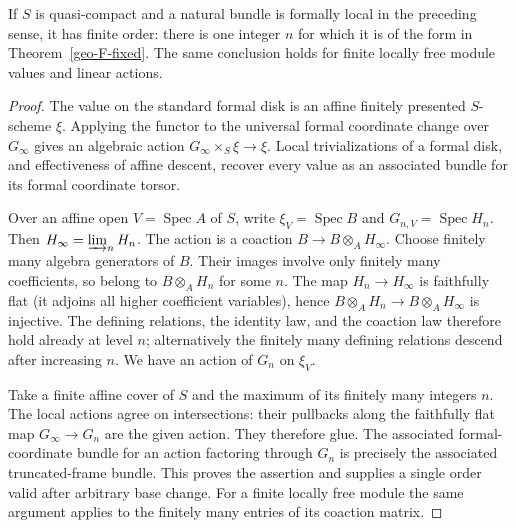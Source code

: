 \begin{theorem}
\label{geo-F-finite}
If $S$ is quasi-compact and a natural bundle is formally local in the
preceding sense, it has finite order: there is one integer $n$ for which it
is of the form in Theorem~\ref{geo-F-fixed}. The same conclusion holds for
finite locally free module values and linear actions.
\end{theorem}
\begin{proof}
The value on the standard formal disk is an affine finitely presented
$S$-scheme $\xi$. Applying the functor to the universal formal coordinate
change over $G_\infty$ gives an algebraic action
$G_\infty\times_S\xi\to\xi$. Local trivializations of a formal disk,
and effectiveness of affine descent, recover every value as an associated
bundle for its formal coordinate torsor.

Over an affine open $V=\operatorname{Spec}A$ of $S$, write
$\xi_V=\operatorname{Spec}B$ and $G_{n,V}=\operatorname{Spec}H_n$.
Then $H_\infty=\varinjlim_nH_n$. The action is a coaction
$B\to B\otimes_AH_\infty$. Choose finitely many algebra generators of
$B$. Their images involve only finitely many coefficients, so belong to
$B\otimes_AH_n$ for some $n$. The map $H_n\to H_\infty$ is faithfully
flat (it adjoins all higher coefficient variables), hence
$B\otimes_AH_n\to B\otimes_AH_\infty$ is injective. The defining
relations, the identity law, and the coaction law therefore hold already
at level $n$; alternatively the finitely many defining relations descend
after increasing $n$. We have an action of $G_n$ on $\xi_V$.

Take a finite affine cover of $S$ and the maximum of its finitely many
integers $n$. The local actions agree on intersections: their pullbacks
along the faithfully flat map $G_\infty\to G_n$ are the given action.
They therefore glue. The associated formal-coordinate bundle for an action
factoring through $G_n$ is precisely the associated truncated-frame bundle.
This proves the assertion and supplies a single order valid after arbitrary
base change. For a finite locally free module the same argument applies to
the finitely many entries of its coaction matrix.
\end{proof}

